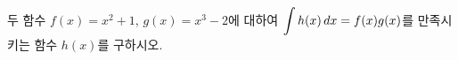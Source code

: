두 함수 $f(x)=x^2+1$, $g(x)=x^3-2$에 대하여 $\displaystyle\int h(x)\mkern3mu dx=f(x)g(x)$를 만족시키는 함수 $h(x)$를 구하시오.
